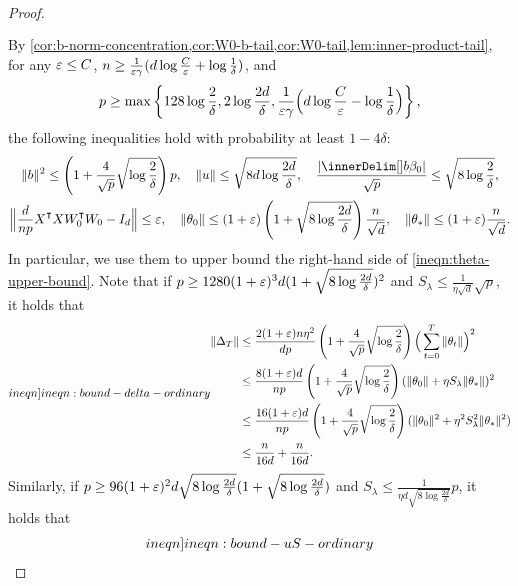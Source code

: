 \begin{proof}
\begin{align}
\begin{split}
    \end{split}
\end{align}
By \cref{cor:b-norm-concentration,cor:W0-b-tail,cor:W0-tail,lem:inner-product-tail}, for any $\varepsilon \leq C$, $n \geq \frac{1}{\varepsilon\gamma} (d\log\frac{C}{\varepsilon} + \log\frac{1}{\delta})$, and
\begin{align*}
    p \geq \max\left\{128\log\frac{2}{\delta},2\log\frac{2d}{\delta},\frac{1}{\varepsilon\gamma} \Big(d\log\frac{C}{\varepsilon} - \log\frac{1}{\delta}\Big)\right\},
\end{align*}
the following inequalities hold with probability at least $1-4\delta$:
\begin{gather*}
    \|b\|^2 \leq \left(1 + \frac{4}{\sqrt p}\sqrt{\log\frac{2}{\delta}}\right) p, \quad \|u\| \leq \sqrt{8d\log\frac{2d}{\delta}}, \quad \frac{|\inner{b}{\beta_0}|}{\sqrt{p}} \leq \sqrt{8\log\frac{2}{\delta}}, \\ 
    \Big\| \frac{d}{np}X\transpose XW_0\transpose W_0 - I_d \Big\| \leq \varepsilon, \quad \|\theta_0\|\leq (1+\eps)\left(1 + \sqrt{8\log\frac{2d}{\delta}}\right)\frac{n}{\sqrt{d}}, \quad \|\theta_*\|\leq (1+\eps)\frac{n}{\sqrt{d}}.
\end{gather*}
In particular, we use them to upper bound the right-hand side of \cref{ineqn:theta-upper-bound}. Note that if $p\geq 1280(1+\varepsilon)^3d(1+\sqrt{8\log\frac{2d}{\delta}})^2$ and $S_\lambda\leq \frac{1}{\eta\sqrt{d}}\sqrt{p}$, it holds that
\begin{align}\label[ineqn]{ineqn:bound-delta-ordinary}
    \begin{split}
        \|\Delta_T\| & \leq \frac{2(1+\eps)n\eta^2}{dp} \left(1 + \frac{4}{\sqrt p}\sqrt{\log\frac{2}{\delta}}\right) \Big(\sum_{t=0}^T\|\theta_t\|\Big)^2 \\
        & \leq \frac{8(1+\eps)d}{np} \left(1 + \frac{4}{\sqrt p}\sqrt{\log\frac{2}{\delta}}\right) (\|\theta_0\|+ \eta S_\lambda\|\theta_\ast\|)^2 \\
        & \leq  \frac{16(1+\eps)d}{np} \left(1 + \frac{4}{\sqrt p}\sqrt{\log\frac{2}{\delta}}\right) (\|\theta_0\|^2 + \eta^2 S_\lambda^2\|\theta_\ast\|^2) \\
        & \leq \frac{n}{16d} + \frac{n}{16d}.
    \end{split}
\end{align}
Similarly, if $p\geq 96(1+\varepsilon)^2 d\sqrt{8\log\frac{2d}{\delta}}(1 + \sqrt{8\log\frac{2d}{\delta}})$ and $S_\lambda\leq \frac{1}{\eta d\sqrt{8\log\frac{2d}{\delta}}}p$, it holds that
\begin{align}\label[ineqn]{ineqn:bound-uS-ordinary}

\end{align}
\end{proof}
